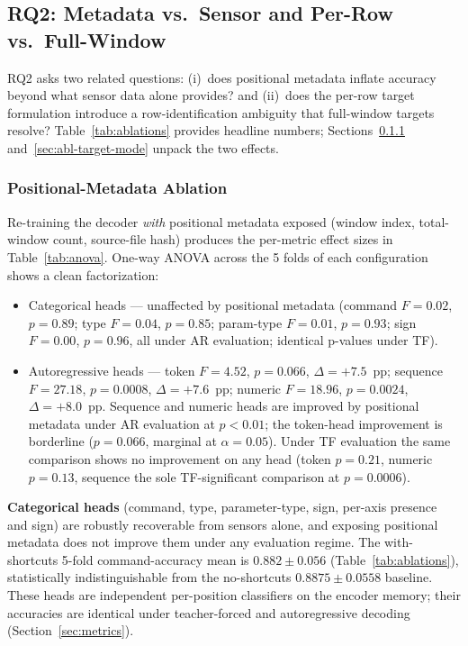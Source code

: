 \documentclass[sensors,article,submit,moreauthors,pdftex]{Definitions/mdpi}
\begin{document}
\subsection{RQ2: Metadata vs.\ Sensor and Per-Row vs.\ Full-Window}
\label{sec:results-rq2}

RQ2 asks two related questions: (i)~does positional metadata inflate accuracy beyond what sensor data alone provides? and (ii)~does the per-row target formulation introduce a row-identification ambiguity that full-window targets resolve? Table~\ref{tab:ablations} provides headline numbers; Sections~\ref{sec:abl-positional} and~\ref{sec:abl-target-mode} unpack the two effects.



\subsubsection{Positional-Metadata Ablation}
\label{sec:abl-positional}
Re-training the decoder \emph{with} positional metadata exposed (window index, total-window count, source-file hash) produces the per-metric effect sizes in Table~\ref{tab:anova}. One-way ANOVA across the 5 folds of each configuration shows a clean factorization:

\begin{itemize}
\item Categorical heads --- unaffected by positional metadata (command $F=0.02$, $p=0.89$; type $F=0.04$, $p=0.85$; param-type $F=0.01$, $p=0.93$; sign $F=0.00$, $p=0.96$, all under AR evaluation; identical p-values under TF).
\item Autoregressive heads --- token $F=4.52$, $p=0.066$, $\Delta=+7.5$~pp; sequence $F=27.18$, $p=0.0008$, $\Delta=+7.6$~pp; numeric $F=18.96$, $p=0.0024$, $\Delta=+8.0$~pp. Sequence and numeric heads are improved by positional metadata under AR evaluation at $p < 0.01$; the token-head improvement is borderline ($p=0.066$, marginal at $\alpha=0.05$). Under TF evaluation the same comparison shows no improvement on any head (token $p=0.21$, numeric $p=0.13$, sequence the sole TF-significant comparison at $p=0.0006$).
\end{itemize}

\textbf{Categorical heads} (command, type, parameter-type, sign, per-axis presence and sign) are robustly recoverable from sensors alone, and exposing positional metadata does not improve them under any evaluation regime. The with-shortcuts 5-fold command-accuracy mean is $0.882 \pm 0.056$ (Table~\ref{tab:ablations}), statistically indistinguishable from the no-shortcuts $0.8875 \pm 0.0558$ baseline. These heads are independent per-position classifiers on the encoder memory; their accuracies are identical under teacher-forced and autoregressive decoding (Section~\ref{sec:metrics}).
\end{document}
